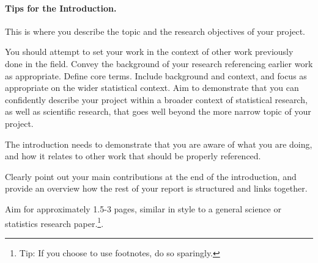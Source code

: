 \paragraph{Tips for the Introduction.} This is where you describe the topic and the research objectives of your project. 

You should attempt to set your work in the context of other work previously done in the field. Convey the background of your research referencing earlier work as appropriate. Define core terms. Include background and context, and focus as appropriate on the wider statistical context. Aim to demonstrate that you can confidently describe your project within a broader context of statistical research, as well as scientific research, that goes well beyond the more narrow topic of your project.


The introduction needs to demonstrate that you are aware of what you are doing, and how it relates to other work that should be properly referenced. 

Clearly point out your main contributions at the end of the introduction, and provide an overview how the rest of your report is structured and links together. 

Aim for approximately 1.5-3 pages, similar in style to a general science or statistics research paper.\footnote{Tip: If you choose to use footnotes, do so sparingly.}.